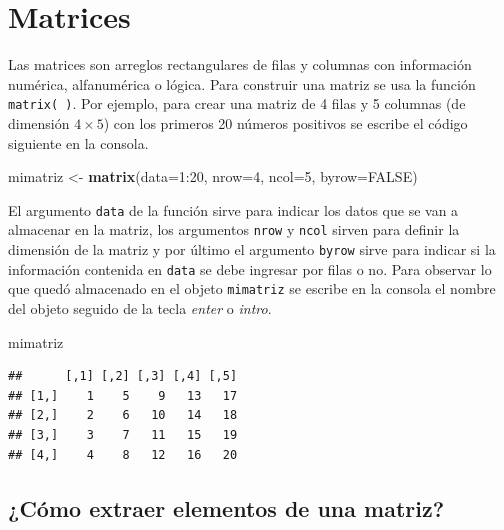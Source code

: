 \documentclass[10pt,]{krantz}
\makeatletter
\newenvironment{Shaded}{\begin{snugshade}}{\end{snugshade}}
\newcommand{\KeywordTok}[1]{\textcolor[rgb]{0.13,0.29,0.53}{\textbf{{#1}}}}
\newcommand{\DataTypeTok}[1]{\textcolor[rgb]{0.13,0.29,0.53}{{#1}}}
\newcommand{\DecValTok}[1]{\textcolor[rgb]{0.00,0.00,0.81}{{#1}}}
\newcommand{\StringTok}[1]{\textcolor[rgb]{0.31,0.60,0.02}{{#1}}}
\newcommand{\OtherTok}[1]{\textcolor[rgb]{0.56,0.35,0.01}{{#1}}}
\newcommand{\NormalTok}[1]{{#1}}
\newenvironment{kframe}{%
\medskip{}
\setlength{\fboxsep}{.8em}
 \def\at@end@of@kframe{}%
 \ifinner\ifhmode%
  \def\at@end@of@kframe{\end{minipage}}%
  \begin{minipage}{\columnwidth}%
 \fi\fi%
 \def\FrameCommand##1{\hskip\@totalleftmargin \hskip-\fboxsep
 \colorbox{shadecolor}{##1}\hskip-\fboxsep
     \hskip-\linewidth \hskip-\@totalleftmargin \hskip\columnwidth}%
 \MakeFramed {\advance\hsize-\width
   \@totalleftmargin\z@ \linewidth\hsize
   \@setminipage}}%
 {\par\unskip\endMakeFramed%
 \at@end@of@kframe}
\renewenvironment{Shaded}{\begin{kframe}}{\end{kframe}}
\makeatother
\begin{document}
\section{Matrices}\label{matrices}

Las matrices  son arreglos rectangulares de filas y
columnas con información numérica, alfanumérica o lógica. Para construir
una matriz se usa la función \texttt{matrix(\ )}. Por ejemplo, para
crear una matriz de 4 filas y 5 columnas (de dimensión \(4 \times 5\))
con los primeros 20 números positivos se escribe el código siguiente en
la consola.

\begin{Shaded}
\begin{Highlighting}[]
\NormalTok{mimatriz <-}\StringTok{ }\KeywordTok{matrix}\NormalTok{(}\DataTypeTok{data=}\DecValTok{1}\NormalTok{:}\DecValTok{20}\NormalTok{, }\DataTypeTok{nrow=}\DecValTok{4}\NormalTok{, }\DataTypeTok{ncol=}\DecValTok{5}\NormalTok{, }\DataTypeTok{byrow=}\OtherTok{FALSE}\NormalTok{)}
\end{Highlighting}
\end{Shaded}

El argumento \texttt{data} de la función sirve para indicar los datos
que se van a almacenar en la matriz, los argumentos \texttt{nrow} y
\texttt{ncol} sirven para definir la dimensión de la matriz y por último
el argumento \texttt{byrow} sirve para indicar si la información
contenida en \texttt{data} se debe ingresar por filas o no. Para
observar lo que quedó almacenado en el objeto \texttt{mimatriz} se
escribe en la consola el nombre del objeto seguido de la tecla
\textit{enter} o \textit{intro}.

\begin{Shaded}
\begin{Highlighting}[]
\NormalTok{mimatriz}
\end{Highlighting}
\end{Shaded}

\begin{verbatim}
##      [,1] [,2] [,3] [,4] [,5]
## [1,]    1    5    9   13   17
## [2,]    2    6   10   14   18
## [3,]    3    7   11   15   19
## [4,]    4    8   12   16   20
\end{verbatim}

\subsection{¿Cómo extraer elementos de una
matriz?}\label{como-extraer-elementos-de-una-matriz}
\end{document}
